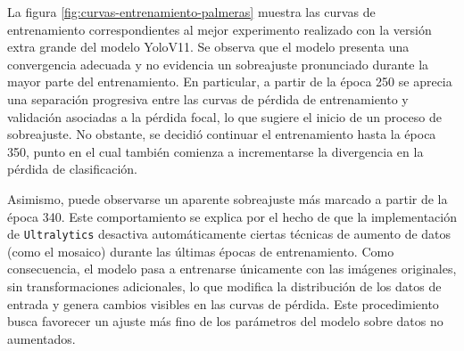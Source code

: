 
La figura \ref{fig:curvas-entrenamiento-palmeras} muestra las curvas de entrenamiento correspondientes al mejor experimento realizado con la versión extra grande del modelo YoloV11. Se observa que el modelo presenta una convergencia adecuada y no evidencia un sobreajuste pronunciado durante la mayor parte del entrenamiento. En particular, a partir de la época 250 se aprecia una separación progresiva entre las curvas de pérdida de entrenamiento y validación asociadas a la pérdida focal, lo que sugiere el inicio de un proceso de sobreajuste. No obstante, se decidió continuar el entrenamiento hasta la época 350, punto en el cual también comienza a incrementarse la divergencia en la pérdida de clasificación.

Asimismo, puede observarse un aparente sobreajuste más marcado a partir de la época 340. Este comportamiento se explica por el hecho de que la implementación de \texttt{Ultralytics} desactiva automáticamente ciertas técnicas de aumento de datos (como el mosaico) durante las últimas épocas de entrenamiento. Como consecuencia, el modelo pasa a entrenarse únicamente con las imágenes originales, sin transformaciones adicionales, lo que modifica la distribución de los datos de entrada y genera cambios visibles en las curvas de pérdida. Este procedimiento busca favorecer un ajuste más fino de los parámetros del modelo sobre datos no aumentados.

